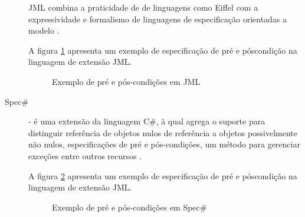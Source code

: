 \begin{description}
JML combina a praticidade de \designbycontract{} de linguagens como Eiffel com a
expressividade e formalismo de linguagens de especificação orientadas a modelo
\cite{leavens2006design}. 

A figura \ref{lst:exemploJML} apresenta um exemplo de especificação de pré e
póscondição na linguagem de extensão JML.

\begin{figure}[h]
\begin{small}

\vspace{-.5cm}
\end{small}
\caption{Exemplo de pré e pós-condições em JML}
\label{lst:exemploJML}
\end{figure}
 
\vspace{8mm}

\item[Spec\#] - é uma extensão da linguagem C\#, à qual agrega o suporte para
distinguir referência de objetos nulos de referência a objetos possivelmente não
nulos, especificações de pré e pós-condições, um método para gerenciar exceções
entre outros recursos \cite{barnett2004spec}.

A figura \ref{lst:exemploSpec} apresenta um exemplo de especificação de pré e
póscondição na linguagem de extensão JML.

\vspace{6mm}

\begin{figure}[h]
\begin{small}

\vspace{-.5cm}
\end{small}
\caption{Exemplo de pré e pós-condições em Spec\#}
\label{lst:exemploSpec}
\end{figure}


\end{description}





 

